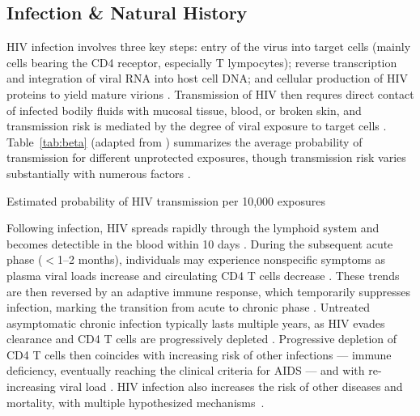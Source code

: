 \subsection{Infection \& Natural History}\label{intro.hiv.tinh}
HIV infection involves three key steps:
entry of the virus into target cells
(mainly cells bearing the CD4 receptor, especially T lympocytes);
reverse transcription and integration of viral RNA into host cell DNA; and
cellular production of HIV proteins to yield mature virions \cite{Maartens2014,Deeks2015}.
Transmission of HIV then requres
direct contact of infected bodily fluids with mucosal tissue, blood, or broken skin,
and transmission risk is mediated by the degree of viral exposure to target cells \cite{Deeks2015}.
Table~\ref{tab:beta} (adapted from \cite{Patel2014}) summarizes
the average probability of transmission for different unprotected exposures,
though transmission risk varies substantially with numerous factors \cite{Boily2009}.
\begin{table}
  \caption{Estimated probability of HIV transmission per 10,000 exposures}
  \label{tab:beta}
  \centering
  
\end{table}
\par
Following infection, HIV spreads rapidly through the lymphoid system
and becomes detectible in the blood within 10 days \cite{Deeks2015}.
During the subsequent acute phase ($<$1--2 months),
individuals may experience nonspecific symptoms
as plasma viral loads increase and circulating CD4 T cells decrease
\cite{Cohen2011ahi,Maartens2014,Deeks2015}.
These trends are then reversed by an adaptive immune response,
which temporarily suppresses infection,
marking the transition from acute to chronic phase \cite{Maartens2014,Deeks2015}.
Untreated asymptomatic chronic infection typically lasts multiple years,
as HIV evades clearance and CD4 T cells are progressively depleted \cite{Deeks2015}.
Progressive depletion of CD4 T cells then coincides with increasing risk of other infections
--- \ie immune deficiency, eventually reaching the clinical criteria for AIDS \cite{WHO2016art} ---
and with re-increasing viral load \cite{Maartens2014,Deeks2015}.
HIV infection also increases the risk of other diseases and mortality,
with multiple hypothesized mechanisms~\cite{Phillips2008}.
